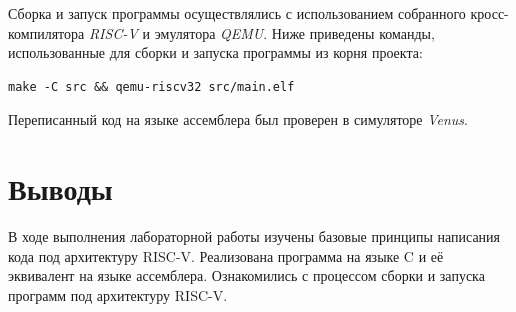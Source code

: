 \documentclass[14pt]{extarticle}
\begin{document}
Сборка и запуск программы осуществлялись с использованием собранного кросс-компилятора \textit{RISC-V} и эмулятора \textit{QEMU}. 
Ниже приведены команды, использованные для сборки и запуска программы из корня проекта:

\begin{center}
\begin{minipage}{0.7\linewidth}
\begin{Verbatim}[frame=single]
make -C src && qemu-riscv32 src/main.elf
\end{Verbatim}
\end{minipage}
\end{center}

Переписанный код на языке ассемблера был проверен в симуляторе \textit{Venus}.

\section{Выводы}

В ходе выполнения лабораторной работы изучены базовые принципы написания кода под архитектуру RISC-V. 
Реализована программа на языке C и её эквивалент на языке ассемблера. 
Ознакомились с процессом сборки и запуска программ под архитектуру RISC-V. 
\end{document}
